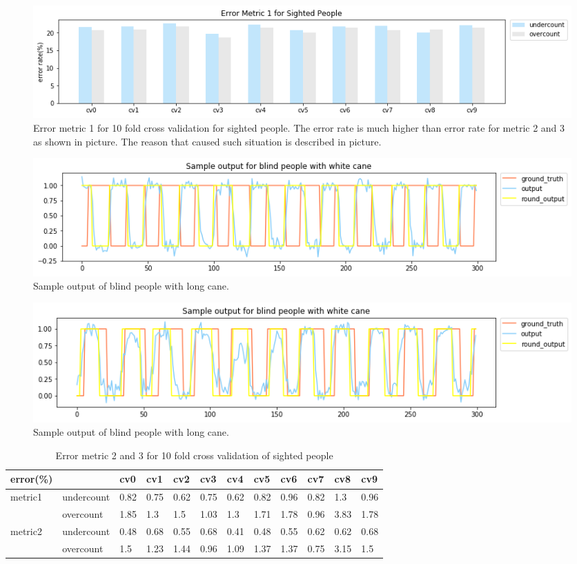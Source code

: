 \documentclass[11pt]{article}
\begin{document}
{\begin{figure}[ht]
\centering
\includegraphics[scale=0.5]{error_metric_1_na_10fold}
\caption{Error metric 1 for 10 fold cross validation for sighted people. The error rate is much higher than error rate for metric 2 and 3 as shown in picture. The reason that caused such situation is described in picture.}
\label{fig:error_metric_1_na_10fold}
\end{figure}


\begin{figure}[ht]
\centering
\includegraphics[scale=0.5]{output_wc_1}
\caption{Sample output of blind people with long cane.}
\label{fig:output_wc_1}
\end{figure}

\begin{figure}[ht]
\centering
\includegraphics[scale=0.5]{output_wc_2}
\caption{Sample output of blind people with long cane.}
\label{fig:output_wc_2}
\end{figure}




\begin{table}[]
\centering
\caption{Error metric 2 and 3 for 10 fold cross validation of sighted people}
\label{label_metric23_sighted}
\begin{tabular}{llllllllllll}
\hline
error(\%)                &            & cv0   & cv1   & cv2   & cv3   & cv4   & cv5   & cv6   & cv7   & cv8   & cv9  \\ \hline
metric1                  & undercount & 0.82  & 0.75  & 0.62  & 0.75  & 0.62  & 0.82  & 0.96  & 0.82  & 1.3   & 0.96 \\
                         & overcount  & 1.85  & 1.3   & 1.5   & 1.03  & 1.3   & 1.71  & 1.78  & 0.96  & 3.83  & 1.78 \\ \hline
\multirow{2}{*}{metric2} & undercount & 0.48  & 0.68  & 0.55  & 0.68  & 0.41  & 0.48  & 0.55  & 0.62  & 0.62  & 0.68 \\
                         & overcount  & 1.5   & 1.23  & 1.44  & 0.96  & 1.09  & 1.37  & 1.37  & 0.75  & 3.15  & 1.5  \\ \hline
\end{tabular}
\end{table}


}
\end{document}
